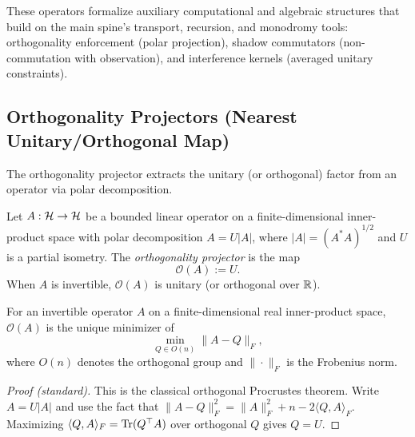 \label{sec:advanced-operators-iv}

These operators formalize auxiliary computational and algebraic structures
that build on the main spine's transport, recursion, and monodromy tools:
orthogonality enforcement (polar projection), shadow commutators
(non-commutation with observation), and interference kernels (averaged unitary
constraints).

\subsection{Orthogonality Projectors (Nearest Unitary/Orthogonal Map)}
\label{subsec:orthogonality-projector}

The orthogonality projector extracts the unitary (or orthogonal) factor from an operator via polar decomposition.

\begin{definition}
\label{def:orthogonality-projector}
Let $A: \mathcal{H} \to \mathcal{H}$ be a bounded linear operator on a finite-dimensional inner-product space with polar decomposition $A = U |A|$, where $|A| = (A^* A)^{1/2}$ and $U$ is a partial isometry.
The \emph{orthogonality projector} is the map
\[
\mathcal{O}(A) := U.
\]
When $A$ is invertible, $\mathcal{O}(A)$ is unitary (or orthogonal over $\mathbb{R}$).
\end{definition}

\begin{proposition}
\label{prop:procrustes}
For an invertible operator $A$ on a finite-dimensional real inner-product space, $\mathcal{O}(A)$ is the unique minimizer of
\[
\min_{Q \in O(n)} \|A - Q\|_F,
\]
where $O(n)$ denotes the orthogonal group and $\|\cdot\|_F$ is the Frobenius norm.
\end{proposition}

\begin{proof}[Proof (standard)]
This is the classical orthogonal Procrustes theorem.
Write $A = U |A|$ and use the fact that $\|A - Q\|_F^2 = \|A\|_F^2 + n - 2\langle Q, A \rangle_F$.
Maximizing $\langle Q, A \rangle_F = \mathrm{Tr}(Q^\top A)$ over orthogonal $Q$ gives $Q = U$.
\end{proof}


